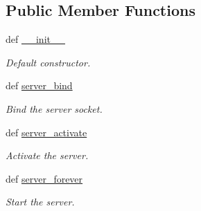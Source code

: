 \subsection*{Public Member Functions}
\begin{DoxyCompactItemize}
\item 
\hypertarget{class_async_http_server_1_1_async_http_server_a1f40cb27ad3596f0cfe7d485d4915a60}{def \hyperlink{class_async_http_server_1_1_async_http_server_a1f40cb27ad3596f0cfe7d485d4915a60}{\-\_\-\-\_\-init\-\_\-\-\_\-}}\label{class_async_http_server_1_1_async_http_server_a1f40cb27ad3596f0cfe7d485d4915a60}

\begin{DoxyCompactList}\small\item\em Default constructor. \end{DoxyCompactList}\item 
\hypertarget{class_async_http_server_1_1_async_http_server_a6bdeabbfb533d9ab41a775e1e7bd56c4}{def \hyperlink{class_async_http_server_1_1_async_http_server_a6bdeabbfb533d9ab41a775e1e7bd56c4}{server\-\_\-bind}}\label{class_async_http_server_1_1_async_http_server_a6bdeabbfb533d9ab41a775e1e7bd56c4}

\begin{DoxyCompactList}\small\item\em Bind the server socket. \end{DoxyCompactList}\item 
def \hyperlink{class_async_http_server_1_1_async_http_server_ac30900bc1acbf9ed8c97f09874ca6140}{server\-\_\-activate}
\begin{DoxyCompactList}\small\item\em Activate the server. \end{DoxyCompactList}\item 
def \hyperlink{class_async_http_server_1_1_async_http_server_a2e97316d792b48283feeb9ae1e7427e6}{server\-\_\-forever}
\begin{DoxyCompactList}\small\item\em Start the server. \end{DoxyCompactList}\end{DoxyCompactItemize}
